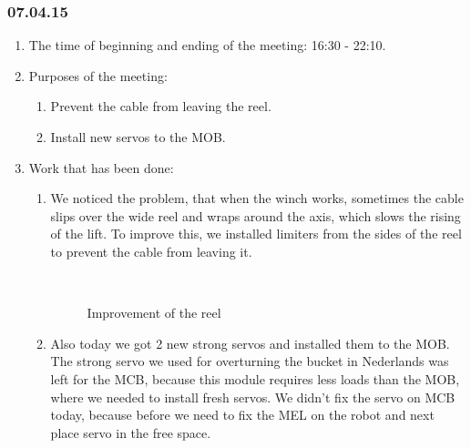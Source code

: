 \subsubsection{07.04.15}
\begin{enumerate}
	
	\item The time of beginning and ending of the meeting: 16:30 - 22:10.
	
	\item Purposes of the meeting: 
	\begin{enumerate}
		
		\item Prevent the cable from leaving the reel.
		
		\item Install new servos to the MOB.
		
	\end{enumerate}

	\item Work that has been done:
	\begin{enumerate}
		
		\item We noticed the problem, that when the winch works, sometimes the cable slips over the wide reel and wraps around the axis, which slows the rising of the lift. To improve this, we installed limiters from the sides of the reel to prevent the cable from leaving it.
		\begin{figure}[H]
			\begin{minipage}[h]{0.2\linewidth}
				\center  
			\end{minipage}
			\begin{minipage}[h]{0.6\linewidth}
				\caption{Improvement of the reel}
			\end{minipage}
		\end{figure}
		
		\item Also today we got 2 new strong servos and installed them to the MOB. The strong servo we used for overturning the bucket in Nederlands was left for the MCB, because this module requires less loads than the MOB, where we needed to install fresh servos. We didn't fix the servo on MCB today, because before we need to fix the MEL on the robot and next place servo in the free space.
		

\end{enumerate}
\end{enumerate}
